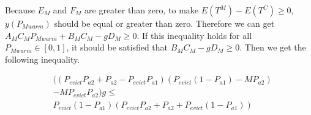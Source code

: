 Because $E_{M}$ and $F_{M}$ are greater than zero, to make $E(T^{M}) - E(T^{C}) \geq 0$, $y(P_{Mwarm})$ should be equal or greater than zero.
Therefore we can get $ A_{M}C_{M}P_{Mwarm}+B_{M}C_{M}-gD_{M} \geq 0$.
If this inequality holds for all $P_{Mwarm} \in [0,1]$, it should be satisfied that $B_{M}C_{M}-gD_{M} \geq 0$.
Then we get the following inequality.

\begin{equation}
\label{equ:gcondition}
\begin{split}
&((P_{evict}P_{a2}+P_{a2}-P_{evict}P_{a1})(P_{evict}(1-P_{a1})-MP_{a2}) \\
&-MP_{evict}P_{a2})g \leq \\
&P_{evict}(1-P_{a1})(P_{evict}P_{a2}+P_{a2}+P_{evict}(1-P_{a1}))
\end{split}\end{equation}

